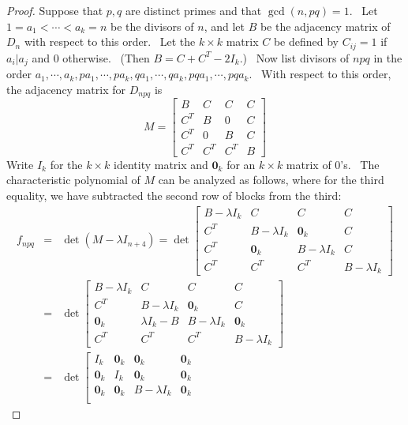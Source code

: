 \documentclass[11pt,a4paper]{amsart}
\theoremstyle{definition}
\numberwithin{equation}{section}
\begin{document}
\begin{proof}
Suppose that $p,q$ are distinct primes and that $\gcd (n,pq)=1$. \ Let 
$1=a_{1}<\cdots <a_{k}=n$ be the divisors of $n$, and let $B$ be the
adjacency matrix of $D_{n}$ with respect to this order. \ Let the $k\times k$
matrix $C$ be defined by $C_{ij}=1$ if $a_{i}|a_{j}$ and $0$ otherwise. \
(Then $B=C+C^{T}-2I_{k}$.) \ Now list divisors of $npq$ in the order $%
a_{1},\cdots ,a_{k},pa_{1},\cdots ,pa_{k},qa_{1},\cdots
,qa_{k},pqa_{1},\cdots ,pqa_{k}$. \ With respect to this order, the
adjacency matrix for $D_{npq}$ is%
\[
M=\left[ 
\begin{array}{cccc}
B & C & C & C \\ 
C^{T} & B & 0 & C \\ 
C^{T} & 0 & B & C \\ 
C^{T} & C^{T} & C^{T} & B%
\end{array}%
\right] 
\]%
Write $I_{k}$ for the $k\times k$ identity matrix and $\mathbf{0}_{k}$ for
an $k\times k$ matrix of $0$'s. \ The characteristic polynomial of $M$ can
be analyzed as follows, where for the third equality, we have subtracted the
second row of blocks from the third:%
\begin{eqnarray*}
f_{npq} &=&\det (M-\lambda I_{n+4})=\det\left[ 
\begin{array}{cccc}
B-\lambda I_{k} & C & C & C \\ 
C^{T} & B-\lambda I_{k} & \mathbf{0}_{k} & C \\ 
C^{T} & \mathbf{0}_{k} & B-\lambda I_{k} & C \\ 
C^{T} & C^{T} & C^{T} & B-\lambda I_{k}%
\end{array}%
\right]  \\
&=&\det \left[ 
\begin{array}{cccc}
B-\lambda I_{k} & C & C & C \\ 
C^{T} & B-\lambda I_{k} & \mathbf{0}_{k} & C \\ 
\mathbf{0}_{k} & \lambda I_{k}-B & B-\lambda I_{k} & \mathbf{0}_{k} \\ 
C^{T} & C^{T} & C^{T} & B-\lambda I_{k}%
\end{array}%
\right]  \\
&=&\det \left[ 
\begin{array}{cccc}
I_{k} & \mathbf{0}_{k} & \mathbf{0}_{k} & \mathbf{0}_{k} \\ 
\mathbf{0}_{k} & I_{k} & \mathbf{0}_{k} & \mathbf{0}_{k} \\ 
\mathbf{0}_{k} & \mathbf{0}_{k} & B-\lambda I_{k} & \mathbf{0}_{k} \\ 

\end{array}
\end{eqnarray*}
\end{proof}
\end{document}

